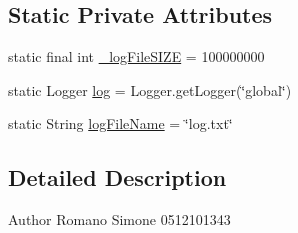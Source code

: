 \subsection*{Static Private Attributes}
\begin{DoxyCompactItemize}
\item 
static final int \hyperlink{classit_1_1isislab_1_1masonassisteddocumentation_1_1mason_1_1wizards_1_1_m_a_s_o_n_documentation_wizard_a988e57db933c354c9f7822a575c3b291}{\-\_\-log\-File\-S\-I\-Z\-E} = 100000000
\item 
static Logger \hyperlink{classit_1_1isislab_1_1masonassisteddocumentation_1_1mason_1_1wizards_1_1_m_a_s_o_n_documentation_wizard_a8f7543d2b138041bdb2657c38afba3ac}{log} = Logger.\-get\-Logger(\char`\"{}global\char`\"{})
\item 
static String \hyperlink{classit_1_1isislab_1_1masonassisteddocumentation_1_1mason_1_1wizards_1_1_m_a_s_o_n_documentation_wizard_a4bd1c3db48ee70d751a4249cc3cf97c3}{log\-File\-Name} = \char`\"{}log.\-txt\char`\"{}
\end{DoxyCompactItemize}


\subsection{Detailed Description}
\begin{DoxyAuthor}{Author}
Romano Simone 0512101343 
\end{DoxyAuthor}


